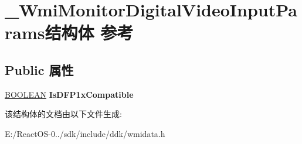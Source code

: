 \hypertarget{struct___wmi_monitor_digital_video_input_params}{}\section{\+\_\+\+Wmi\+Monitor\+Digital\+Video\+Input\+Params结构体 参考}
\label{struct___wmi_monitor_digital_video_input_params}
\subsection*{Public 属性}
\begin{DoxyCompactItemize}
\item 
\mbox{\label{struct___wmi_monitor_digital_video_input_params_afd809e5376c0e2324af92abce9cd4954}} 
\hyperlink{_processor_bind_8h_a112e3146cb38b6ee95e64d85842e380a}{B\+O\+O\+L\+E\+AN} {\bfseries Is\+D\+F\+P1x\+Compatible}
\end{DoxyCompactItemize}


该结构体的文档由以下文件生成\+:\begin{DoxyCompactItemize}
\item 
E\+:/\+React\+O\+S-\/0../sdk/include/ddk/wmidata.\+h\end{DoxyCompactItemize}
